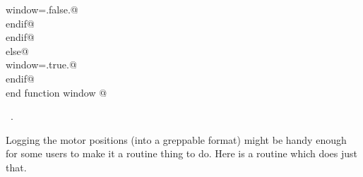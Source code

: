 \documentclass[10pt,a4paper,notitlepage]{article}
\begin{document}
\begin{flushleft}
\begin{minipage}{\linewidth}
\begin{list}{}{}
\mbox{}\verb@            window=.false.@\\
\mbox{}\verb@          endif@\\
\mbox{}\verb@        endif@\\
\mbox{}\verb@      else@\\
\mbox{}\verb@        window=.true.@\\
\mbox{}\verb@      endif@\\
\mbox{}\verb@      end function window                                                  @{\NWsep}
\end{list}
\vspace{-1.5ex}
\footnotesize
\begin{list}{}{\setlength{\itemsep}{-\parsep}\setlength{\itemindent}{-\leftmargin}}
\item \NWtxtMacroRefIn\ .

\item{}
\end{list}
\end{minipage}\vspace{4ex}
\end{flushleft}
Logging the motor positions (into a greppable format) might be handy enough
for some users to make it a routine thing to do. Here is a routine which
does just that.
\end{document}

